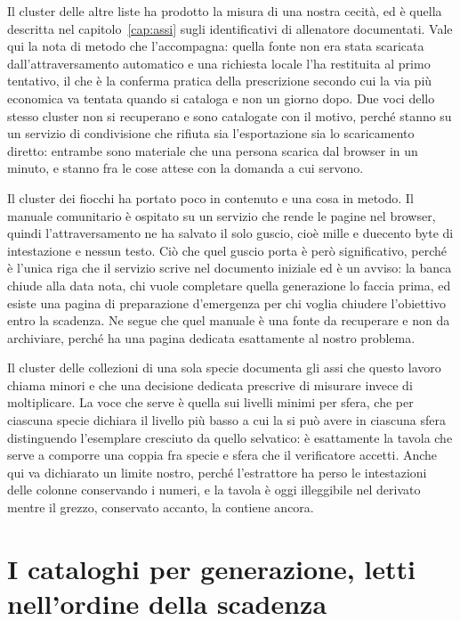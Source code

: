 Il cluster delle altre liste ha prodotto la misura di una nostra cecità, ed è quella descritta nel capitolo~\ref{cap:assi} sugli identificativi di allenatore documentati. Vale qui la nota di metodo che l'accompagna: quella fonte non era stata scaricata dall'attraversamento automatico e una richiesta locale l'ha restituita al primo tentativo, il che è la conferma pratica della prescrizione secondo cui la via più economica va tentata quando si cataloga e non un giorno dopo. Due voci dello stesso cluster non si recuperano e sono catalogate con il motivo, perché stanno su un servizio di condivisione che rifiuta sia l'esportazione sia lo scaricamento diretto: entrambe sono materiale che una persona scarica dal browser in un minuto, e stanno fra le cose attese con la domanda a cui servono.

Il cluster dei fiocchi ha portato poco in contenuto e una cosa in metodo. Il manuale comunitario è ospitato su un servizio che rende le pagine nel browser, quindi l'attraversamento ne ha salvato il solo guscio, cioè mille e duecento byte di intestazione e nessun testo. Ciò che quel guscio porta è però significativo, perché è l'unica riga che il servizio scrive nel documento iniziale ed è un avviso: la banca chiude alla data nota, chi vuole completare quella generazione lo faccia prima, ed esiste una pagina di preparazione d'emergenza per chi voglia chiudere l'obiettivo entro la scadenza. Ne segue che quel manuale è una fonte da recuperare e non da archiviare, perché ha una pagina dedicata esattamente al nostro problema.

Il cluster delle collezioni di una sola specie documenta gli assi che questo lavoro chiama minori e che una decisione dedicata prescrive di misurare invece di moltiplicare. La voce che serve è quella sui livelli minimi per sfera, che per ciascuna specie dichiara il livello più basso a cui la si può avere in ciascuna sfera distinguendo l'esemplare cresciuto da quello selvatico: è esattamente la tavola che serve a comporre una coppia fra specie e sfera che il verificatore accetti. Anche qui va dichiarato un limite nostro, perché l'estrattore ha perso le intestazioni delle colonne conservando i numeri, e la tavola è oggi illeggibile nel derivato mentre il grezzo, conservato accanto, la contiene ancora.

\section{I cataloghi per generazione, letti nell'ordine della scadenza}

